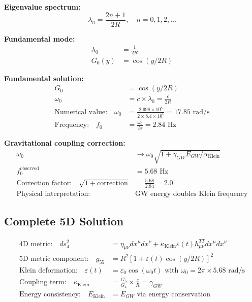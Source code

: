 \documentclass[12pt,a4paper]{article}
\begin{document}
\textbf{Eigenvalue spectrum:}
\begin{equation}
\lambda_n = \frac{2n+1}{2R}, \quad n = 0,1,2,\ldots
\end{equation}

\textbf{Fundamental mode:}
\begin{align}
\lambda_0 &= \frac{1}{2R}\\
G_0(y) &= \cos(y/2R)
\end{align}

\textbf{Fundamental solution:}
\begin{align}
G_0 &= \cos(y/2R)\\
\omega_0 &= c \times \lambda_0 = \frac{c}{2R}\\
\text{Numerical value:} \quad \omega_0 &= \frac{2.998 \times 10^8}{2 \times 8.4 \times 10^6} = 17.85 \text{ rad/s}\\
\text{Frequency:} \quad f_0 &= \frac{\omega_0}{2\pi} = 2.84 \text{ Hz}
\end{align}

\textbf{Gravitational coupling correction:}
\begin{align}
\omega_0 &\rightarrow \omega_0\sqrt{1 + \gamma_{GW} E_{GW}/\alpha_{\text{Klein}}}\\
f_0^{\text{observed}} &= 5.68 \text{ Hz}\\
\text{Correction factor:} \quad \sqrt{1 + \text{correction}} &= \frac{5.68}{2.84} = 2.0\\
\text{Physical interpretation:} \quad &\text{GW energy doubles Klein frequency}
\end{align}

\subsection{Complete 5D Solution}

\begin{align}
\text{4D metric:} \quad ds_4^2 &= \eta_{\mu\nu} dx^\mu dx^\nu + \kappa_{\text{Klein}} \varepsilon(t) h_{\mu\nu}^{TT} dx^\mu dx^\nu\\
\text{5D metric component:} \quad g_{55} &= R^2[1 + \varepsilon(t)\cos(y/2R)]^2\\
\text{Klein deformation:} \quad \varepsilon(t) &= \varepsilon_0 \cos(\omega_0 t) \text{ with } \omega_0 = 2\pi \times 5.68 \text{ rad/s}\\
\text{Coupling term:} \quad \kappa_{\text{Klein}} &= \frac{G_5}{G_4} \times \frac{c}{R} = \gamma_{GW}\\
\text{Energy consistency:} \quad E_{\text{Klein}} &= E_{GW} \text{ via energy conservation}
\end{align}
\end{document}
